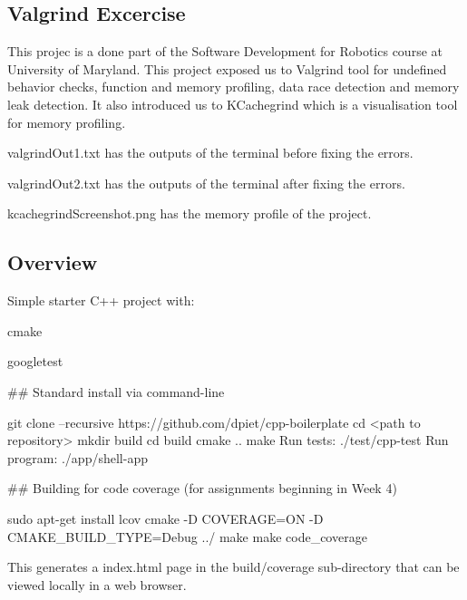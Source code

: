 \subsection*{\href{https://travis-ci.org/dpiet/cpp-boilerplate}{\tt } }

\subsection*{Valgrind Excercise}

This projec is a done part of the Software Development for Robotics course at University of Maryland. This project exposed us to Valgrind tool for undefined behavior checks, function and memory profiling, data race detection and memory leak detection. It also introduced us to K\+Cachegrind which is a visualisation tool for memory profiling.
\begin{DoxyItemize}
\item valgrind\+Out1.\+txt has the outputs of the terminal before fixing the errors.
\item valgrind\+Out2.\+txt has the outputs of the terminal after fixing the errors.
\item kcachegrind\+Screenshot.\+png has the memory profile of the project. 


\end{DoxyItemize}

\subsection*{Overview}

Simple starter C++ project with\+:


\begin{DoxyItemize}
\item cmake
\item googletest
\end{DoxyItemize}

\#\# Standard install via command-\/line 
\begin{DoxyCode}
git clone --recursive https://github.com/dpiet/cpp-boilerplate
cd <path to repository>
mkdir build
cd build
cmake ..
make
Run tests: ./test/cpp-test
Run program: ./app/shell-app
\end{DoxyCode}


\#\# Building for code coverage (for assignments beginning in Week 4) 
\begin{DoxyCode}
sudo apt-get install lcov
cmake -D COVERAGE=ON -D CMAKE\_BUILD\_TYPE=Debug ../
make
make code\_coverage
\end{DoxyCode}
 This generates a index.\+html page in the build/coverage sub-\/directory that can be viewed locally in a web browser.

